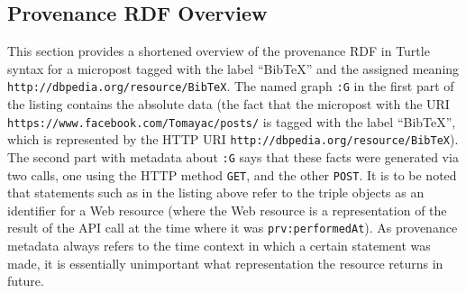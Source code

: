 \documentclass[twocolumn]{article}
\begin{document}
\subsection{Provenance RDF Overview}                                           \label{sec:appendix}
This section provides a shortened overview of the provenance RDF in Turtle syntax for a  micropost tagged with the label ``BibTeX'' and the assigned
meaning \texttt{http://dbpedia.org/resource/BibTeX}. The named graph \texttt{:G} in the first part of the listing contains the absolute data (the fact that the  micropost with the URI \texttt{https://www.facebook.com/Tomayac/posts/} is tagged with the label ``BibTeX'', which is represented by the HTTP URI \texttt{http://dbpedia.org/resource/BibTeX}). The second part with metadata about \texttt{:G} says that these facts were generated via two calls, one using the HTTP method \texttt{GET}, and the other \texttt{POST}.
It is to be noted that statements such as in the listing above refer to the triple objects as an identifier for a Web resource (where the Web resource is a representation of the result of the API call at the time where it was \texttt{prv:performedAt}). As provenance metadata always refers to the time context in which a certain statement was made, it is essentially unimportant what representation the resource returns in future.
\vspace{2em}
\end{document}
